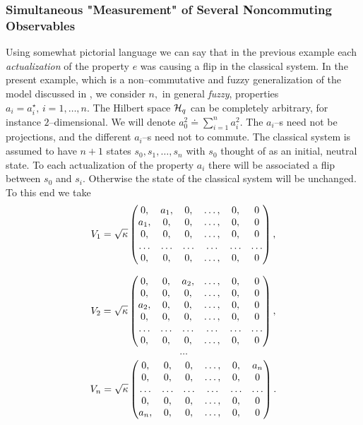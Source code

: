 \documentclass[12pt]{article}
\begin{document}
\subsubsection{Simultaneous "Measurement" of Several Noncommuting Observables}

Using somewhat pictorial language we can say that in the previous
example each {\sl actualization} of the property
 $e$ was causing a flip in the classical system.  In the present
example,  which is a non--commutative and fuzzy generalization of the model 
discussed in \cite{bla1},  we
consider
$n , $   in general {\sl fuzzy},  properties
$a_i=a_i^\star , \,  i=1, \ldots , n. $ 
The Hilbert space ${\cal H}_q$ can be completely arbitrary, 
for instance $2$--dimensional.    We will
denote
$a_0^2\doteq\sum_{i=1}^n a_i^2 . $ The 
$a_i$--s need not be projections,  and the different $a_i$--s 
need not to commute.   The classical system
is assumed to have
$n+1$ states
$s_0, s_1, \ldots , s_n$ with $s_0$ thought of as an initial,  
neutral state. 
  To
each actualization of the property $a_i$ there will be associated a
flip between
$s_0$ and
$s_i . $  Otherwise
the state of the classical system will be unchanged.  To this end we
take 
$$V_{1} ={\sqrt\kappa}
 \begin{pmatrix}0,     & a_{1} ,  &0 ,  &\ldots ,  &0 ,    
&0
\cr
                   a_{1}, & 0     ,  &0 ,  &\ldots ,  &0 ,     &0 \cr
                   0,    & 0     ,  &0 ,  &\ldots ,  &0 ,     &0\cr
\ldots&\ldots   &\ldots&\ldots &\ldots&\ldots\cr
                   0    , & 0     ,  &0 ,  &\ldots ,  &0 ,    &0\end{pmatrix} , $$

$$V_{2} = {\sqrt\kappa}\begin{pmatrix}0,     & 0     ,  & a_{2} ,  &\ldots ,  &0
,  &0\cr
                   0    , & 0     ,  &0 ,  &\ldots ,  &0 ,  &0\cr
                   a_{2}, & 0     ,  &0 ,  &\ldots ,  &0 ,  &0\cr
                   0    , & 0     ,  &0 ,  &\ldots ,  &0 ,  &0\cr
                   \ldots&\ldots   &\ldots&\ldots&\ldots&\ldots\cr
                   0    , & 0     ,  &0 ,  &\ldots ,  &0 ,  &0\end{pmatrix} , $$
\vspace{0.5cm} $$\ldots$$ \vspace{0.5cm}
$$V_{n} = {\sqrt\kappa}\begin{pmatrix}0,     & 0     ,  & 0 ,  &\ldots ,  &0 , 
&a_{n}\cr
                   0    , & 0     ,  &0 ,  &\ldots ,  &0 ,  &0\cr
                   \ldots&\ldots   &\ldots&\ldots&\ldots&\ldots\cr
                   0    , & 0     ,  &0 ,  &\ldots ,  &0 ,  &0\cr
                   a_{n}    , & 0     ,  &0 ,  &\ldots ,  &0 ,  &0\end{pmatrix} . $$
\end{document}
